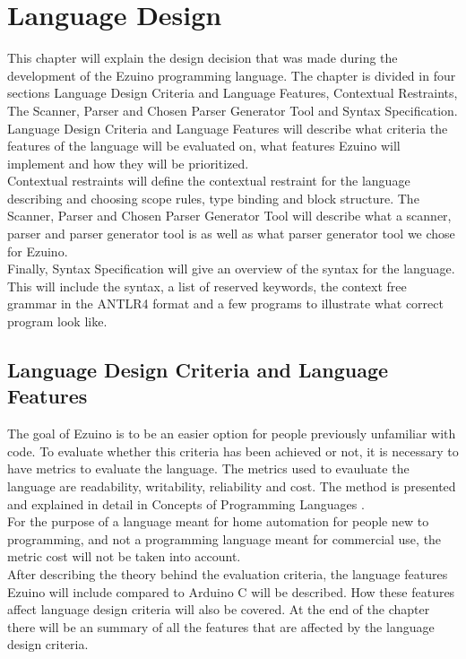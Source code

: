 \chapter{Language Design}\label{ch:langspec}
This chapter will explain the design decision that was made during the development of the Ezuino programming language. The chapter is divided in four sections Language Design Criteria and Language Features, Contextual Restraints, The Scanner, Parser and Chosen Parser Generator Tool and Syntax Specification. \\
Language Design Criteria and Language Features will describe what criteria the features of the language will be evaluated on, what features Ezuino will implement and how they will be prioritized. \\
Contextual restraints will define the contextual restraint for the language describing and choosing scope rules, type binding and block structure.  
The Scanner, Parser and Chosen Parser Generator Tool will describe what a scanner, parser and parser generator tool is as well as what parser generator tool we chose for Ezuino. \\
Finally, Syntax Specification will give an overview of the syntax for the language. This will include the syntax, a list of reserved keywords, the context free grammar in the ANTLR4 format and a few programs to illustrate what correct program look like. 
\section{Language Design Criteria and Language Features}
The goal of Ezuino is to be an easier option for people previously unfamiliar with code. To evaluate whether this criteria has been achieved or not, it is necessary to have metrics to evaluate the language. 
The metrics used to evauluate the language are readability, writability, reliability and cost.
The method is presented and explained in detail in Concepts of Programming Languages  \cite{conceptsOfProgrammingLanguages}.\\
For the purpose of a language meant for home automation for people new to programming, and not a programming language meant for commercial use, the metric cost will not be taken into account. \\
After describing the theory behind the evaluation criteria, the language features Ezuino will include compared to Arduino C will be described. How these features affect language design criteria will also be covered. At the end of the chapter there will be an summary of all the features that are affected by the language design criteria.